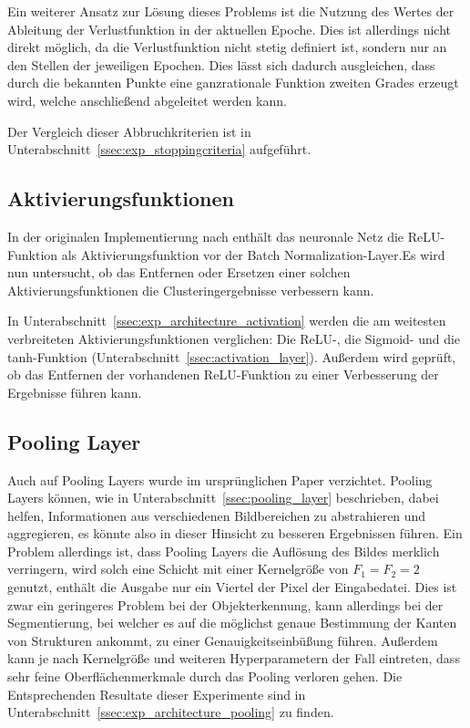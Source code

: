 Ein weiterer Ansatz zur Lösung dieses Problems ist die Nutzung des Wertes der Ableitung der Verlustfunktion in der aktuellen Epoche. Dies ist allerdings nicht direkt möglich, da die Verlustfunktion nicht stetig definiert ist, sondern nur an den Stellen der jeweiligen Epochen. Dies lässt sich dadurch ausgleichen, dass durch die bekannten Punkte eine ganzrationale Funktion zweiten Grades erzeugt wird, welche anschließend abgeleitet werden kann.

Der Vergleich dieser Abbruchkriterien ist in Unterabschnitt~\ref{ssec:exp_stoppingcriteria} aufgeführt.

\subsection{Aktivierungsfunktionen}
\label{ssec:network_architecture_activation}

In der originalen Implementierung nach \cite{kanezaki_18} enthält das neuronale Netz die ReLU-Funktion als Aktivierungsfunktion vor der Batch Normalization-Layer.Es wird nun untersucht, ob das Entfernen oder Ersetzen einer solchen Aktivierungsfunktionen die Clusteringergebnisse verbessern kann.

In Unterabschnitt~\ref{ssec:exp_architecture_activation} werden die am weitesten verbreiteten Aktivierungsfunktionen verglichen: Die ReLU-, die Sigmoid- und die tanh-Funktion (\vgl Unterabschnitt~\ref{ssec:activation_layer}). Außerdem wird geprüft, ob das Entfernen der vorhandenen ReLU-Funktion zu einer Verbesserung der Ergebnisse führen kann.

\subsection{Pooling Layer}
\label{ssec:network_architecture_pooling}

Auch auf Pooling Layers wurde im ursprünglichen Paper verzichtet. Pooling Layers können, wie in Unterabschnitt~\ref{ssec:pooling_layer} beschrieben, dabei helfen, Informationen aus verschiedenen Bildbereichen zu abstrahieren und aggregieren, es könnte also in dieser Hinsicht zu besseren Ergebnissen führen. Ein Problem allerdings ist, dass Pooling Layers die Auflösung des Bildes merklich verringern, wird solch eine Schicht \bspw mit einer Kernelgröße von $F_1=F_2=2$ genutzt, enthält die Ausgabe nur ein Viertel der Pixel der Eingabedatei. Dies ist zwar ein geringeres Problem bei der Objekterkennung, kann allerdings bei der Segmentierung, bei welcher es auf die möglichst genaue Bestimmung der Kanten von Strukturen ankommt, zu einer Genauigkeitseinbüßung führen. Außerdem kann je nach Kernelgröße und weiteren Hyperparametern der Fall eintreten, dass sehr feine Oberflächenmerkmale durch das Pooling verloren gehen. Die Entsprechenden Resultate dieser Experimente sind in Unterabschnitt~\ref{ssec:exp_architecture_pooling} zu finden.

